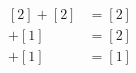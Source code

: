\documentclass[preview]{standalone}
\begin{document}
\begin{align*}
\begin{aligned}[2] + [2] &= [2] \\[1] + [1] &= [2] \\[2] + [1] &= [1]\end{aligned}
\end{align*}
\end{document}
